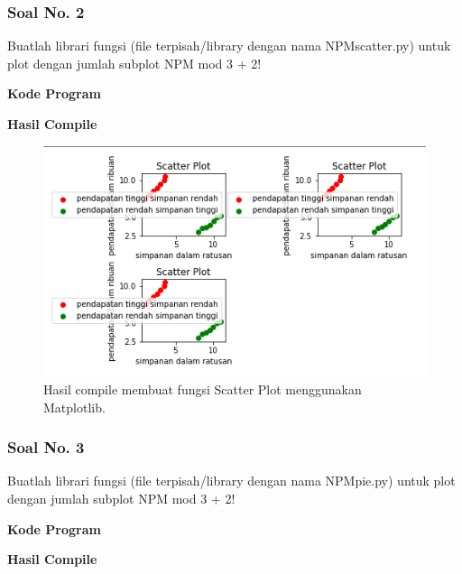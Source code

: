 \subsubsection{Soal No. 2}
\hfill \break
Buatlah librari fungsi (file terpisah/library dengan nama NPMscatter.py) untuk plot dengan jumlah subplot NPM mod 3 + 2!

\hfill \break
\textbf{Kode Program}



\hfill \break
\textbf{Hasil Compile}

\begin{figure}[H]
	\includegraphics[width=12cm]{figures/6/1174017/p2.png}
	\centering
	\caption{Hasil compile membuat fungsi Scatter Plot menggunakan Matplotlib.}
\end{figure}

\subsubsection{Soal No. 3}
\hfill \break
Buatlah librari fungsi (file terpisah/library dengan nama NPMpie.py) untuk plot dengan jumlah subplot NPM mod 3 + 2!

\hfill \break
\textbf{Kode Program}



\hfill \break
\textbf{Hasil Compile}

